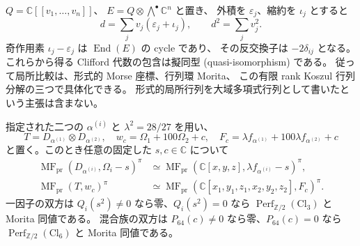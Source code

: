 \begin{remark}
$Q=\mathbb C[[v_1,\ldots,v_n]]$、
$E=Q\otimes\bigwedge^\bullet\mathbb C^n$ と置き、
外積を $\varepsilon_j$、縮約を $\iota_j$ とすると
\[
 d=\sum_jv_j(\varepsilon_j+\iota_j),\qquad d^2=\sum_jv_j^2.
\]
奇作用素 $\iota_j-\varepsilon_j$ は $\operatorname{End}(E)$ の cycle であり、
その反交換子は $-2\delta_{ij}$ となる。
これらから得る Clifford 代数の包含は擬同型 (quasi-isomorphism) である。
従って局所比較は、形式的 Morse 座標、行列環 Morita、
この有限 rank Koszul 行列分解の三つで具体化できる。
形式的局所行列を大域多項式行列として書いたという主張は含まない。
\end{remark}

\begin{proposition}
\label{cmo:prop:pointwise-affine-mf-comparison}
指定された二つの $\alpha^{(i)}$ と
$\lambda^2=28/27$ を用い、
\[
 T=D_{\alpha^{(1)}}\otimes D_{\alpha^{(2)}},\quad
 w_c=\Omega_1+100\Omega_2+c,\quad
 F_c=\lambda f_{\alpha^{(1)}}+100\lambda f_{\alpha^{(2)}}+c
\]
と置く。このとき任意の固定した $s,c\in\mathbb C$ について
\begin{align*}
 \operatorname{MF}_{\mathrm{pr}}(D_{\alpha^{(i)}},\Omega_i-s)^\pi
 &\simeq
 \operatorname{MF}_{\mathrm{pr}}(\mathbb C[x,y,z],\lambda f_{\alpha^{(i)}}-s)^\pi,\\
 \operatorname{MF}_{\mathrm{pr}}(T,w_c)^\pi
 &\simeq
 \operatorname{MF}_{\mathrm{pr}}(\mathbb C[x_1,y_1,z_1,x_2,y_2,z_2],F_c)^\pi.
\end{align*}
一因子の双方は $Q_i(s^2)\ne0$ なら零、$Q_i(s^2)=0$ なら
$\operatorname{Perf}_{\mathbb Z/2}(\mathrm{Cl}_3)$ と Morita 同値である。
混合族の双方は $P_{64}(c)\ne0$ なら零、$P_{64}(c)=0$ なら
$\operatorname{Perf}_{\mathbb Z/2}(\mathrm{Cl}_6)$ と Morita 同値である。
\end{proposition}

